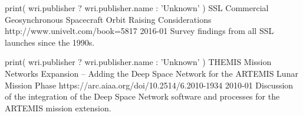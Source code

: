 


\begin{cventries}

  \cventry
    {
    print( wri.publisher ? wri.publisher.name : 'Unknown' )
    } %
    {SSL Commercial Geosynchronous Spacecraft Orbit Raising Considerations} %
    {http://www.univelt.com/book=5817} %
    {2016-01} %
    {Survey findings from all SSL launches since the 1990s.} %


  \cventry
    {
    print( wri.publisher ? wri.publisher.name : 'Unknown' )
    } %
    {THEMIS Mission Networks Expansion – Adding the Deep Space Network for the ARTEMIS Lunar Mission Phase} %
    {https://arc.aiaa.org/doi/10.2514/6.2010-1934} %
    {2010-01} %
    {Discussion of the integration of the Deep Space Network software and processes for the ARTEMIS mission extension.} %


\end{cventries}

